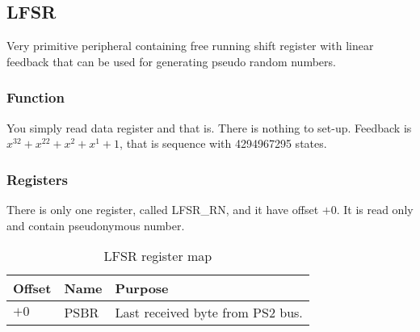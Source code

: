 \subsection{LFSR}

Very primitive peripheral containing free running shift register with 
linear feedback that can be used for generating pseudo random numbers.

\subsubsection{Function}

You simply read data register and that is. There is nothing to set-up. 
Feedback is $x^{32} + x^{22} + x^{2} + x^{1} + 1$, that is sequence 
with 4294967295 states.

\subsubsection{Registers}

There is only one register, called LFSR\_RN, and it have offset $+0$. It 
is read only and contain pseudonymous number.

\begin{table}[h]
    \centering
    \begin{tabular}{|l|l|l|}
        \hline
        \textbf{Offset} & \textbf{Name} & \textbf{Purpose}                 \\ \hline
        $+0$            & PSBR          & Last received byte from PS2 bus. \\ \hline
    \end{tabular}
    \caption{LFSR register map}
    \label{tab:lfsr_reg_map}
\end{table}
